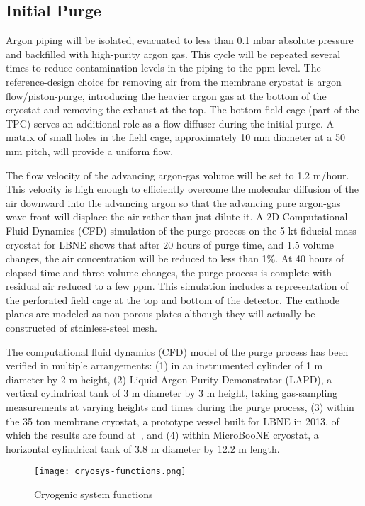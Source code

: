 \subsection{Initial Purge} 

Argon piping will be isolated, evacuated to less than 0.1 mbar
absolute pressure and backfilled with high-purity argon gas.
This cycle will be repeated several times to reduce contamination
levels in the piping to the ppm level. The reference-design choice
for removing air from the membrane cryostat is argon
flow/piston-purge, introducing the heavier argon gas at the
bottom of the cryostat and removing the exhaust at the top. The bottom
field cage (part of the TPC) serves an additional role as a flow
diffuser during the initial purge. A matrix of small holes in the
field cage, approximately 10 mm diameter at a 50 mm pitch,
will provide a uniform flow.

The flow velocity of the advancing argon-gas volume will be set to 1.2 m/hour.
This velocity is high enough to efficiently overcome the molecular diffusion
of the air downward into the advancing argon so that the advancing pure
argon-gas wave front will displace the air rather than just dilute it.
A 2D Computational Fluid Dynamics (CFD) simulation of the purge process
on the 5 kt fiducial-mass cryostat for LBNE shows that after 20 hours
of purge time, and 1.5 volume changes, the air concentration will be
reduced to less than 1\%. At 40 hours of elapsed time and three volume
changes, the purge process is complete with residual air reduced to a
few ppm. This simulation includes a representation of the perforated
field cage at the top and bottom of the detector.  The cathode planes
are modeled as non-porous plates although they will actually be
constructed of stainless-steel mesh.

The computational fluid dynamics (CFD) model of the purge process 
has been verified in multiple arrangements: (1) in an instrumented 
cylinder of 1 m diameter by 2 m height, (2) Liquid Argon Purity 
Demonstrator (LAPD), a vertical cylindrical tank of 3 m diameter by 3 m height,
taking gas-sampling measurements at varying heights and times during 
the purge process, (3) within the 35 ton membrane cryostat, a 
prototype vessel built for LBNE in 2013, of which the results 
are found at~\cite{Montanari:2013/06/13aqa}, %
and (4) within MicroBooNE cryostat, a horizontal cylindrical
tank of 3.8 m diameter by 12.2 m length.

\begin{figure}[htbp]
\centering
\texttt{[image: cryosys-functions.png]} 
\caption{Cryogenic system functions}
\label{fig:v5ch2-LBNF-block-diagram-2014}
\end{figure}

